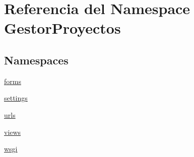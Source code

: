 \hypertarget{namespace_gestor_proyectos}{}\section{Referencia del Namespace Gestor\+Proyectos}
\label{namespace_gestor_proyectos}
\subsection*{Namespaces}
\begin{DoxyCompactItemize}
\item 
 \hyperlink{namespace_gestor_proyectos_1_1forms}{forms}
\item 
 \hyperlink{namespace_gestor_proyectos_1_1settings}{settings}
\item 
 \hyperlink{namespace_gestor_proyectos_1_1urls}{urls}
\item 
 \hyperlink{namespace_gestor_proyectos_1_1views}{views}
\item 
 \hyperlink{namespace_gestor_proyectos_1_1wsgi}{wsgi}
\end{DoxyCompactItemize}
